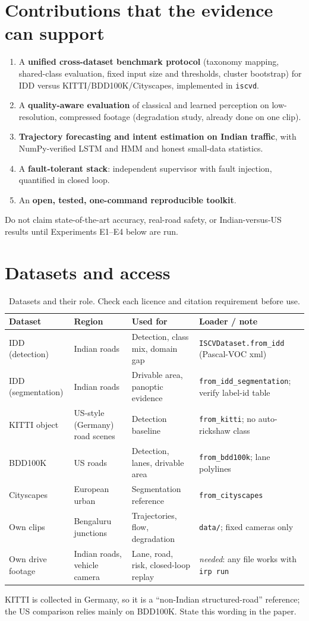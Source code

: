 \documentclass[11pt,a4paper]{article}
\begin{document}
\section{Contributions that the evidence can support}
\begin{enumerate}
\item A \textbf{unified cross-dataset benchmark protocol} (taxonomy mapping, shared-class evaluation, fixed input size and thresholds, cluster bootstrap) for IDD versus KITTI/BDD100K/Cityscapes, implemented in \texttt{iscvd}.
\item A \textbf{quality-aware evaluation} of classical and learned perception on low-resolution, compressed footage (degradation study, already done on one clip).
\item \textbf{Trajectory forecasting and intent estimation on Indian traffic}, with NumPy-verified LSTM and HMM and honest small-data statistics.
\item A \textbf{fault-tolerant stack}: independent supervisor with fault injection, quantified in closed loop.
\item An \textbf{open, tested, one-command reproducible toolkit}.
\end{enumerate}
Do not claim state-of-the-art accuracy, real-road safety, or Indian-versus-US results until Experiments E1--E4 below are run.

\section{Datasets and access}
\begin{table}[h]
\centering\small
\caption{Datasets and their role. Check each licence and citation requirement before use.}
\begin{tabular}{@{}p{2.4cm}p{3.3cm}p{4.2cm}p{4.2cm}@{}}
\toprule
Dataset & Region & Used for & Loader / note \\
\midrule
IDD (detection) & Indian roads & Detection, class mix, domain gap & \texttt{ISCVDataset.from\_idd} (Pascal-VOC xml) \\
IDD (segmentation) & Indian roads & Drivable area, panoptic evidence & \texttt{from\_idd\_segmentation}; verify label-id table \\
KITTI object & US-style (Germany) road scenes & Detection baseline & \texttt{from\_kitti}; no auto-rickshaw class \\
BDD100K & US roads & Detection, lanes, drivable area & \texttt{from\_bdd100k}; lane polylines \\
Cityscapes & European urban & Segmentation reference & \texttt{from\_cityscapes} \\
Own clips & Bengaluru junctions & Trajectories, flow, degradation & \texttt{data/}; fixed cameras only \\
Own drive footage & Indian roads, vehicle camera & Lane, road, risk, closed-loop replay & \emph{needed}: any file works with \texttt{irp run} \\
\bottomrule
\end{tabular}
\end{table}
KITTI is collected in Germany, so it is a ``non-Indian structured-road'' reference; the US comparison relies mainly on BDD100K. State this wording in the paper.
\end{document}
